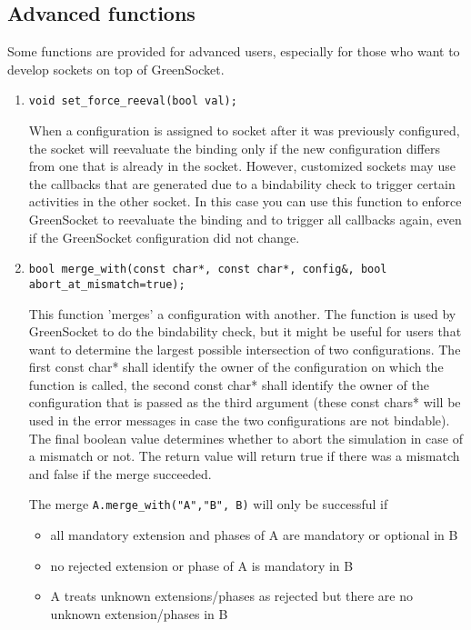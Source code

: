 \documentclass[a4paper,10pt]{article}          %
\begin{document}
\subsection{Advanced functions}

Some functions are provided for advanced users, especially for those who want to develop sockets on top of GreenSocket.

\begin{enumerate}
\item 
\verb|void set_force_reeval(bool val);|

When a configuration is assigned to socket after it was previously configured, the socket will reevaluate the binding only if the new configuration differs from one that is already in the socket.
However, customized sockets may use the callbacks that are generated due to a bindability check to trigger certain activities in the other socket.
In this case you can use this function to enforce GreenSocket to reevaluate the binding and to trigger all callbacks again, even if the GreenSocket configuration did not change.

\item
\verb|bool merge_with(const char*, const char*, config&, bool abort_at_mismatch=true);|

This function 'merges' a configuration with another. The function is used by GreenSocket to do the bindability check, but it might be useful for users that want to determine the largest possible intersection of two configurations.
The first const char* shall identify the owner of the configuration on which the function is called, the second const char* shall identify the owner of the configuration that is passed as the third argument (these const chars* will be used in the error messages in case the two configurations are not bindable).
The final boolean value determines whether to abort the simulation in case of a mismatch or not. The return value will return true if there was a mismatch and false if the merge succeeded.

The merge \verb|A.merge_with("A","B", B)| will only be successful if
\begin{itemize}
\item all mandatory extension and phases of A are mandatory or optional in B
\item no rejected extension or phase of A is mandatory in B
\item A treats unknown extensions/phases as rejected but there are no unknown extension/phases in B
\end{itemize}


\end{enumerate}
\end{document}
